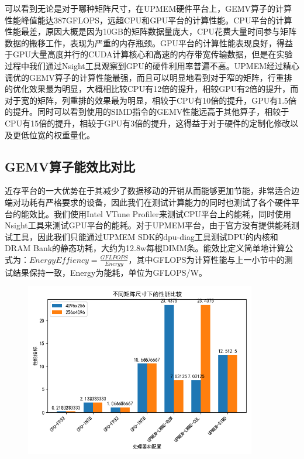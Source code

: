 可以看到无论是对于哪种矩阵尺寸，在UPMEM硬件平台上，GEMV算子的计算性能峰值能达387GFLOPS，远超CPU和GPU平台的计算性能。CPU平台的计算性能最差，原因大概是因为10GB的矩阵数据量庞大，CPU花费大量时间参与矩阵数据的搬移工作，表现为严重的内存瓶颈。GPU平台的计算性能表现良好，得益于GPU大量高度并行的CUDA计算核心和高速的内存带宽传输数据，但是在实验过程中我们通过Nsight工具观察到GPU的硬件利用率普遍不高。UPMEM经过精心调优的GEMV算子的计算性能最强，而且可以明显地看到对于窄的矩阵，行重排的优化效果最为明显，大概相比较CPU有12倍的提升，相较GPU有2倍的提升，而对于宽的矩阵，列重排的效果最为明显，相较于CPU有10倍的提升，GPU有1.5倍的提升。同时可以看到使用的SIMD指令的GEMV性能远高于其他算子，相较于CPU有15倍的提升，相较于GPU有3倍的提升，这得益于对于硬件的定制化修改以及更低位宽的权重量化。

\subsection{GEMV算子能效比对比}
近存平台的一大优势在于其减少了数据移动的开销从而能够更加节能，非常适合边端对功耗有严格要求的设备，因此我们在测试计算能力的同时也测试了各个硬件平台的能效比。我们使用Intel VTune Profiler来测试CPU平台上的能耗，同时使用Nsight工具来测试GPU平台的能耗。对于UPMEM平台，由于官方没有提供能耗测试工具，因此我们只能通过UPMEM SDK的dpu-diag工具测试DPU的内核和DRAM Bank的静态功耗，大约为12.8w每根DIMM条。能效比定义简单地计算公式为：\(EnergyEffiency=\frac{GFLPOPS}{Energy}\)，其中GFLOPS为计算性能与上一小节中的测试结果保持一致，Energy为能耗，单位为GFLOPS/W。

\begin{figure}[htbp]
    \centering
    \includegraphics[width=0.9\textwidth]{figures/Exp1-2.png}
	\label{EXP1-2} %
\end{figure}

